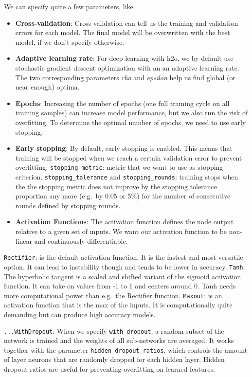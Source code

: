\documentclass[]{article}
\begin{document}
We can specify quite a few parameters, like

\begin{itemize}
\item
  \textbf{Cross-validation}: Cross validation can tell us the training
  and validation errors for each model. The final model will be
  overwritten with the best model, if we don't specify otherwise.
\item
  \textbf{Adaptive learning rate}: For deep learning with h2o, we by
  default use stochastic gradient descent optimization with an an
  adaptive learning rate. The two corresponding parameters \emph{rho}
  and \emph{epsilon} help us find global (or near enough) optima.
\item
  \textbf{Epochs}: Increasing the number of epochs (one full training
  cycle on all training samples) can increase model performance, but we
  also run the risk of overfitting. To determine the optimal number of
  epochs, we need to use early stopping.
\item
  \textbf{Early stopping}: By default, early stopping is enabled. This
  means that training will be stopped when we reach a certain validation
  error to prevent overfitting. \texttt{stopping\_metric}: metric that
  we want to use as stopping criterion. \texttt{stopping\_tolerance} and
  \texttt{stopping\_rounds}: training stops when the the stopping metric
  does not improve by the stopping tolerance proportion any more
  (e.g.~by 0.05 or 5\%) for the number of consecutive rounds defined by
  stopping rounds.
\item
  \textbf{Activation Functions}: The activation function defines the
  node output relative to a given set of inputs. We want our activation
  function to be non-linear and continuously differentiable.
\end{itemize}

\texttt{Rectifier}: is the default activation function. It is the
fastest and most versatile option. It can lead to instability though and
tends to be lower in accuracy. \texttt{Tanh}: The hyperbolic tangent is
a scaled and shifted variant of the sigmoid activation function. It can
take on values from -1 to 1 and centers around 0. Tanh needs more
computational power than e.g.~the Rectifier function. \texttt{Maxout}:
is an activation function that is the max of the inputs. It is
computationally quite demanding but can produce high accuracy models.

\texttt{...WithDropout}: When we specify \texttt{with\ dropout}, a
random subset of the network is trained and the weights of all
sub-networks are averaged. It works together with the parameter
\texttt{hidden\_dropout\_ratios}, which controls the amount of layer
neurons that are randomly dropped for each hidden layer. Hidden dropout
ratios are useful for preventing overfitting on learned features.
\end{document}

